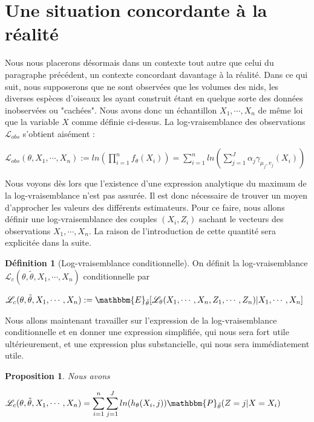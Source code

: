 \documentclass[frenchb]{report}
\newcommand{\1}{\mathbbm{1}}
\newcommand{\E}{\mathbbm{E}}
\newcommand{\prob}{\mathbbm{P}}
\newcommand{\lv}{\mathcal{L}}
\newcommand{\thetat}{\tilde{\theta}}
\newtheorem{prop}{Proposition}
\theoremstyle{definition}\newtheorem{defn}{Définition}
\theoremstyle{definition}\newtheorem{exm}{Exemple}
\theoremstyle{definition}\newtheorem{nota}{Notation}
\theoremstyle{definition}\newtheorem{rem}{Remarque}
\begin{document}
\section{Une situation concordante à la réalité} %
Nous nous placerons désormais dans un contexte tout autre que celui du paragraphe précédent, un contexte concordant davantage à la réalité. Dans ce qui suit, nous supposerons que ne sont observées que les volumes des nids, les diverses espèces d'oiseaux les ayant construit étant en quelque sorte des données inobservées ou "cachées". Nous avons donc un échantillon $X_1,\cdots, X_n$ de même loi que la variable $X$ comme définie ci-dessus. \newline
La log-vraisemblance des observations $\mathcal{L}_{obs}$ s'obtient aisément : 
\begin{center} $\mathcal{L}_{obs}(\theta, X_1, \cdots, X_n) := ln\left( \displaystyle\prod_{i=1}^n f_\theta(X_i) \right) = \displaystyle\sum_{i=1}^nln\left( \sum_{j=1}^J \alpha_j \gamma_{\mu_j, v_j}(X_i) \right)$ \end{center}
Nous voyons dès lors que l'existence d'une expression analytique du maximum de la log-vraisemblance n'est pas assurée. Il est donc nécessaire de trouver un moyen d'approcher les valeurs des différents estimateurs. \newline
Pour ce faire, nous allons définir une log-vraisemblance des couples $(X_i,Z_i)$ sachant le vecteurs des observations $X_1, \cdots, X_n$. La raison de l'introduction de cette quantité sera explicitée dans la suite.
\begin{defn}[Log-vraisemblance conditionnelle]
On définit la log-vraisemblance $\lv_{c}(\theta, \thetat, X_1, \cdots, X_n) $ conditionnelle par
\begin{center} $\lv_{c}(\theta, \thetat, X_1, \cdots, X_n) := \E_{\thetat}[\lv_\theta(X_1, \cdots, X_n, Z_1, \cdots, Z_n) | X_1, \cdots, X_n]$ \end{center}
\end{defn}

Nous allons maintenant travailler sur l'expression de la log-vraisemblance conditionnelle et en donner une expression simplifiée, qui nous sera fort utile ultérieurement, et une expression plus substancielle, qui nous sera immédiatement utile.

\begin{prop}
Nous avons
\begin{center} $\lv_{c}(\theta, \thetat, X_1, \cdots, X_n) = \displaystyle\sum_{i=1}^n\sum_{j=1}^J ln(h_\theta(X_i ,j))  \prob_{\thetat}(Z = j|X = X_i)$ \end{center}
\end{prop}
\end{document}

